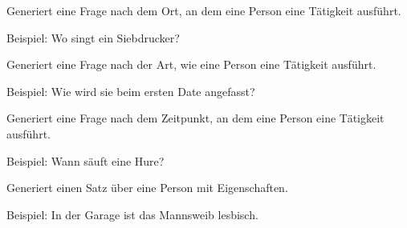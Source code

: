 \documentclass[a4paper,12pt,oneside]{sphinxmanual}
\begin{document}

\begin{fulllineitems}
\label{funktionen:pyzufall.satz_frage_3}
Generiert eine Frage nach dem Ort, an dem eine Person eine Tätigkeit ausführt.

Beispiel: Wo singt ein Siebdrucker?

\end{fulllineitems}


\begin{fulllineitems}
\label{funktionen:pyzufall.satz_frage_4}
Generiert eine Frage nach der Art, wie eine Person eine Tätigkeit ausführt.

Beispiel: Wie wird sie beim ersten Date angefasst?

\end{fulllineitems}


\begin{fulllineitems}
\label{funktionen:pyzufall.satz_frage_5}
Generiert eine Frage nach dem Zeitpunkt, an dem eine Person eine Tätigkeit ausführt.

Beispiel: Wann säuft eine Hure?

\end{fulllineitems}


\begin{fulllineitems}
\label{funktionen:pyzufall.satz_freunde_lieben}
Generiert einen Satz über eine Person mit Eigenschaften.

Beispiel: In der Garage ist das Mannsweib lesbisch.

\end{fulllineitems}

\end{document}
